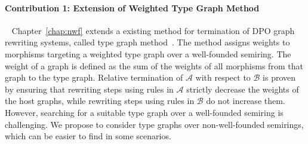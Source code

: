 
 

\paragraph{Contribution 1: Extension of Weighted Type Graph Method}\ \newline
Chapter~\ref{chap:nwf} extends a existing method for termination of DPO graph rewriting systems, called type graph method~\cite{zantema2014termination,bruggink2014termination,bruggink2015proving,endrullis2024generalized_icgt}. 
The method assigns weights to morphisms targeting a weighted type graph over a well-founded semiring. The weight of a graph is defined
 as the sum of the weights of all morphisms from that graph to the type graph. Relative termination of $\mathcal{A}$ with respect to $\mathcal{B}$ is proven by ensuring that rewriting steps using rules in \( \mathcal{A} \) strictly decrease the weights of the host graphs, while rewriting steps using rules in \( \mathcal{B} \) do not increase them. However, searching for a suitable type graph over a well-founded semiring is challenging. We propose to consider type graphs over non-well-founded semirings, which can be easier to find in some scenarios.
